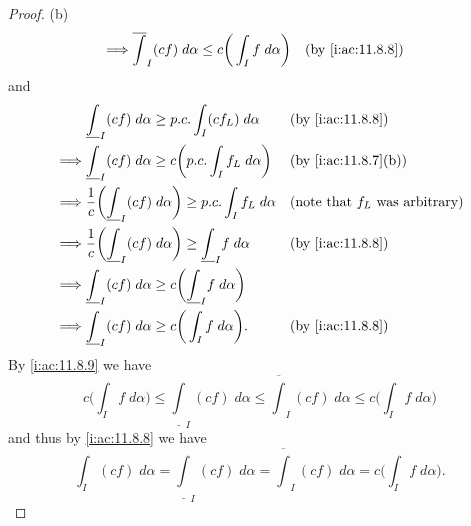 \begin{proof}{(b)}
\begin{align*}
    \implies & \overline{\int}_I (cf) \; d \alpha \leq c\bigg(\int_I f \; d \alpha\bigg)                        &  & \by{i:ac:11.8.8}
  \end{align*}
  and
  \begin{align*}
             & \underline{\int}_I (cf) \; d \alpha \geq p.c. \int_I (c f_L) \; d \alpha                           &  & \by{i:ac:11.8.8}                         \\
    \implies & \underline{\int}_I (cf) \; d \alpha \geq c \bigg(p.c. \int_I f_L \; d \alpha\bigg)                 &  & \by{i:ac:11.8.7}[b]                      \\
    \implies & \dfrac{1}{c} \bigg(\underline{\int}_I (cf) \; d \alpha\bigg) \geq p.c. \int_I f_L \; d \alpha      &  & \text{(note that \(f_L\) was arbitrary)} \\
    \implies & \dfrac{1}{c} \bigg(\underline{\int}_I (cf) \; d \alpha\bigg) \geq \underline{\int}_I f \; d \alpha &  & \by{i:ac:11.8.8}                         \\
    \implies & \underline{\int}_I (cf) \; d \alpha \geq c\bigg(\underline{\int}_I f \; d \alpha\bigg)                                                           \\
    \implies & \underline{\int}_I (cf) \; d \alpha \geq c\bigg(\int_I f \; d \alpha\bigg).                        &  & \by{i:ac:11.8.8}
  \end{align*}
  By \cref{i:ac:11.8.9} we have
  \[
    c\bigg(\int_I f \; d \alpha\bigg) \leq \underline{\int}_I (cf) \; d \alpha \leq \overline{\int}_I (cf) \; d \alpha \leq c\bigg(\int_I f \; d \alpha\bigg)
  \]
  and thus by \cref{i:ac:11.8.8} we have
  \[
    \int_I (cf) \; d \alpha = \underline{\int}_I (cf) \; d \alpha = \overline{\int}_I (cf) \; d \alpha = c\bigg(\int_I f \; d \alpha\bigg).
  \]


\end{proof}
